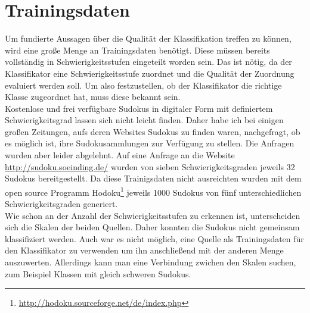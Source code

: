\section{Trainingsdaten}
Um fundierte Aussagen über die Qualität der Klassifikation treffen zu können, wird eine große Menge an Trainingsdaten benötigt. Diese müssen bereits vollständig in Schwierigkeitsstufen eingeteilt worden sein. Das ist nötig, da der Klassifikator eine Schwierigkeitsstufe zuordnet und die Qualität der Zuordnung evaluiert werden soll. Um also festzustellen, ob der Klassifikator die richtige Klasse zugeordnet hat, muss diese bekannt sein.\\
Kostenlose und frei verfügbare Sudokus in digitaler Form mit definiertem Schwierigkeitsgrad lassen sich nicht leicht finden. Daher habe ich bei einigen großen Zeitungen, aufs deren Websites Sudokus zu finden waren, nachgefragt, ob es möglich ist, ihre Sudokusammlungen zur Verfügung zu stellen. Die Anfragen wurden aber leider abgelehnt. Auf eine Anfrage an die Website \url{http://sudoku.soeinding.de/} wurden von sieben Schwierigkeitsgraden jeweils 32 Sudokus bereitgestellt. Da diese Trainigsdaten nicht ausreichten wurden mit dem open source Programm Hodoku\footnote{\url{http://hodoku.sourceforge.net/de/index.php}} jeweils 1000 Sudokus von fünf unterschiedlichen Schwierigkeitsgraden generiert.\\
Wie schon an der Anzahl der Schwierigkeitsstufen zu erkennen ist, unterscheiden sich die Skalen der beiden Quellen. Daher konnten die Sudokus nicht gemeinsam klassifiziert werden. Auch war es nicht möglich, eine Quelle als Trainingsdaten für den Klassifikator zu verwenden um ihn anschließend mit der anderen Menge auszuwerten. Allerdings kann man eine Verbindung zwichen den Skalen suchen, zum Beispiel Klassen mit gleich schweren Sudokus.\\